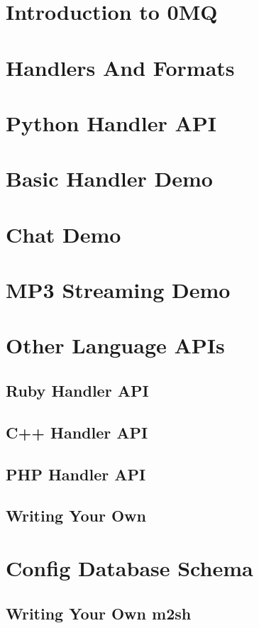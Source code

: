 \section{Introduction to 0MQ}


\section{Handlers And Formats}


\section{Python Handler API}


\section{Basic Handler Demo}


\section{Chat Demo}


\section{MP3 Streaming Demo}


\section{Other Language APIs}


\subsection{Ruby Handler API}


\subsection{C++ Handler API}


\subsection{PHP Handler API}


\subsection{Writing Your Own}


\section{Config Database Schema}


\subsection{Writing Your Own m2sh}



